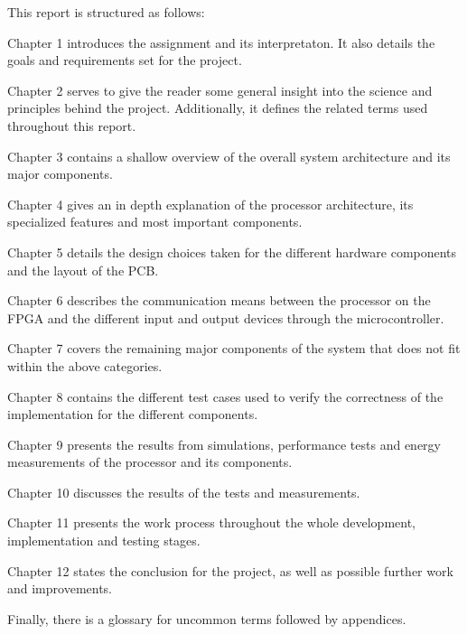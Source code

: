 This report is structured as follows:

Chapter 1 introduces the assignment and its interpretaton. 
It also details the goals and requirements set for the project.

Chapter 2 serves to give the reader some general insight into the science and principles behind the project.
Additionally, it defines the related terms used throughout this report.

Chapter 3 contains a shallow overview of the overall system architecture and its major components.

Chapter 4 gives an in depth explanation of the processor architecture, its specialized features and most important components.

Chapter 5 details the design choices taken for the different hardware components and the layout of the PCB.

Chapter 6 describes the communication means between the processor on the FPGA and the different input and output devices through the microcontroller.

Chapter 7 covers the remaining major components of the system that does not fit within the above categories.

Chapter 8 contains the different test cases used to verify the correctness of the implementation for the different components.

Chapter 9 presents the results from simulations, performance tests and energy measurements of the processor and its components.

Chapter 10 discusses the results of the tests and measurements.

Chapter 11 presents the work process throughout the whole development, implementation and testing stages.

Chapter 12 states the conclusion for the project, as well as possible further work and improvements.

Finally, there is a glossary for uncommon terms followed by appendices.

